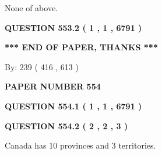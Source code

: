 \documentclass[12pt]{article}
\begin{document}
 
\noindent{}
 
 
 None of above.
 
 
 
 
  
\vspace{0.2in}
  
{\textbf{\Large{QUESTION
553.2 
 ( 1 , 1 , 6791 )
}}}
  
  
   
   
 \vspace{0.2in}
 
   
   
   
   
\vspace{1.0in} 
{\textbf{\large{ *** END OF PAPER, THANKS *** }}} 
   
   
\hspace{1.0in} By: 
 239 ( 416 ,  613 )
   
   
   
   
\newpage 
\setcounter{page}{ 
   554001 } 
   
   
   
   
 {\textbf{ \Large{ PAPER NUMBER  554  }}}
   
   
\vspace{0.2in}
   
   
   
   
   
   
 \vspace{0.2in}
 
 
 
 
   
   
  
\vspace{0.2in}
  
{\textbf{\Large{QUESTION
554.1 
 ( 1 , 1 , 6791 )
}}}
  
  
  
\vspace{0.2in}
  
{\textbf{\Large{QUESTION
554.2 
 ( 2 , 2 , 3 )
}}}
  
  
 
 
\noindent{}
 
 
Canada has 10  provinces and 3 territories.
 
\end{document}
